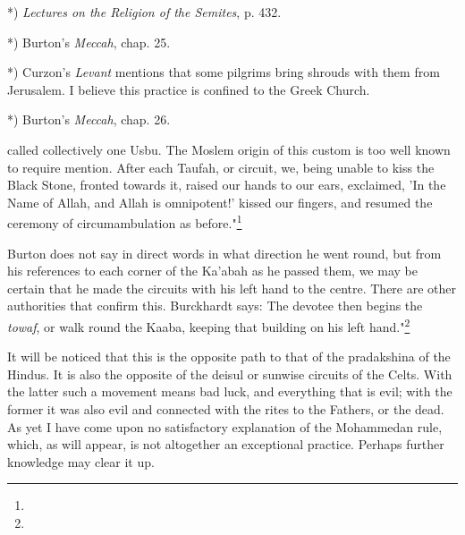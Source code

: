 \documentclass[a4paper, 11pt, oneside, polutonikogreek, english]{article}
\begin{document}
*) \emph{Lectures on the Religion of the Semites}, p. 432.

*) Burton's \emph{Meccah}, chap. 25.

*) Curzon's \emph{Levant} mentions that some pilgrims bring shrouds with them from Jerusalem. I believe this practice is confined to the Greek Church.

*) Burton's \emph{Meccah}, chap. 26.

called collectively one Usbu. The Moslem origin of this custom is too well known to require mention. After each Taufah, or circuit, we, being unable to kiss the Black Stone, fronted towards it, raised our hands to our ears, exclaimed, 'In the Name of Allah, and Allah is omnipotent!' kissed our fingers, and resumed the ceremony of circumambulation as before."\footnote{}

Burton does not say in direct words in what direction he went round, but from his references to each corner of the Ka'abah as he passed them, we may be certain that he made the circuits with his left hand to the centre. There are other authorities that confirm this. Burckhardt says: The devotee then begins the \emph{towaf}, or walk round the Kaaba, keeping that building on his left hand."\footnote{}

It will be noticed that this is the opposite path to that of the pradakshina of the Hindus. It is also the opposite of the deisul or sunwise circuits of the Celts. With the latter such a movement means bad luck, and everything that is evil; with the former it was also evil and connected with the rites to the Fathers, or the dead. As yet I have come upon no satisfactory explanation of the Mohammedan rule, which, as will appear, is not altogether an exceptional practice. Perhaps further knowledge may clear it up.
\end{document}
